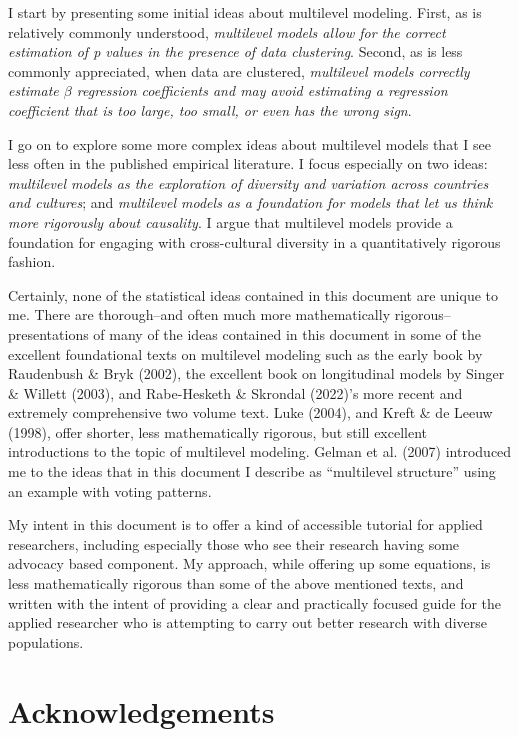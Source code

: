 \documentclass[
  letterpaper,
  DIV=11,
  numbers=noendperiod]{scrreprt}
\begin{document}
I start by presenting some initial ideas about multilevel modeling.
First, as is relatively commonly understood, \emph{multilevel models
allow for the correct estimation of p values in the presence of data
clustering}. Second, as is less commonly appreciated, when data are
clustered, \emph{multilevel models correctly estimate \(\beta\)
regression coefficients and may avoid estimating a regression
coefficient that is too large, too small, or even has the wrong sign}.

I go on to explore some more complex ideas about multilevel models that
I see less often in the published empirical literature. I focus
especially on two ideas: \emph{multilevel models as the exploration of
diversity and variation across countries and cultures}; and
\emph{multilevel models as a foundation for models that let us think
more rigorously about causality}. I argue that multilevel models provide
a foundation for engaging with cross-cultural diversity in a
quantitatively rigorous fashion.

Certainly, none of the statistical ideas contained in this document are
unique to me. There are thorough--and often much more mathematically
rigorous--presentations of many of the ideas contained in this document
in some of the excellent foundational texts on multilevel modeling such
as the early book by Raudenbush \& Bryk (2002), the excellent book on
longitudinal models by Singer \& Willett (2003), and Rabe-Hesketh \&
Skrondal (2022)'s more recent and extremely comprehensive two volume
text. Luke (2004), and Kreft \& de Leeuw (1998), offer shorter, less
mathematically rigorous, but still excellent introductions to the topic
of multilevel modeling. Gelman et al. (2007) introduced me to the ideas
that in this document I describe as ``multilevel structure'' using an
example with voting patterns.

My intent in this document is to offer a kind of accessible tutorial for
applied researchers, including especially those who see their research
having some advocacy based component. My approach, while offering up
some equations, is less mathematically rigorous than some of the above
mentioned texts, and written with the intent of providing a clear and
practically focused guide for the applied researcher who is attempting
to carry out better research with diverse populations.


\chapter*{Acknowledgements}\label{acknowledgements}
\end{document}
